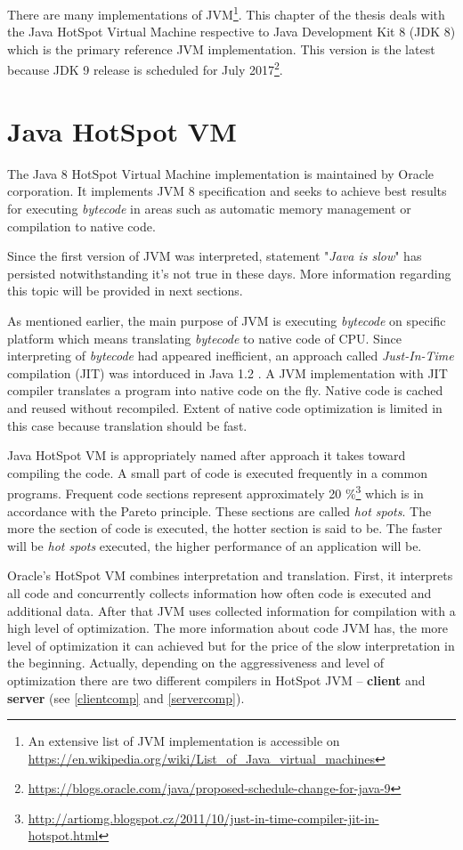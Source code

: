 \documentclass[
  digital, %
  oneside,
  notable, %
  nolof,     %
  nolot     %
]{fithesis3}
\begin{document}
There are many implementations of JVM\footnote{An extensive list of JVM implementation is accessible on \url{https://en.wikipedia.org/wiki/List_of_Java_virtual_machines}}. This chapter of the thesis deals with the Java HotSpot Virtual Machine respective to Java Development Kit 8 (JDK 8) which is the primary reference JVM implementation. This version is the latest because JDK 9 release is scheduled for July 2017\footnote{\url{https://blogs.oracle.com/java/proposed-schedule-change-for-java-9}}.

\section{Java HotSpot VM}
The Java 8 HotSpot Virtual Machine implementation is maintained by Oracle corporation. It implements JVM 8 specification and seeks to achieve best results for executing \textit{bytecode} in areas such as automatic memory management or compilation to native code.

Since the first version of JVM was interpreted, statement "\textit{Java is slow}" has persisted notwithstanding it's not true in these days. More information regarding this topic will be provided in next sections.

As mentioned earlier, the main purpose of JVM is executing \textit{bytecode} on specific platform which means translating \textit{bytecode} to native code of CPU. Since interpreting of \textit{bytecode} had appeared inefficient, an approach called \textit{Just-In-Time} compilation (JIT) was intorduced in Java 1.2 \cite{javavsc}. A JVM implementation with JIT compiler translates a program into native code on the fly. Native code is cached and reused without recompiled. Extent of native code optimization is limited in this case because translation should be fast.

Java HotSpot VM is appropriately named after approach it takes toward compiling the code. A small part of code is executed frequently in a common programs. Frequent code sections represent approximately 20 \%\footnote{\url{http://artiomg.blogspot.cz/2011/10/just-in-time-compiler-jit-in-hotspot.html}} which is in accordance with the Pareto principle. These sections are called \textit{hot spots}. The more the section of code is executed, the hotter section is said to be. The faster will be \textit{hot spots} executed, the higher performance of an application will be. \cite{scott}

Oracle's HotSpot VM combines interpretation and translation. First, it interprets all code and concurrently collects information how often code is executed and additional data. After that JVM uses collected information for compilation with a high level of optimization. The more information about code JVM has, the more level of optimization it can achieved but for the price of the slow interpretation in the beginning. Actually, depending on the aggressiveness and level of optimization there are two different compilers in HotSpot JVM -- \textbf{client} and \textbf{server} (see \ref{clientcomp} and \ref{servercomp}).
\end{document}
